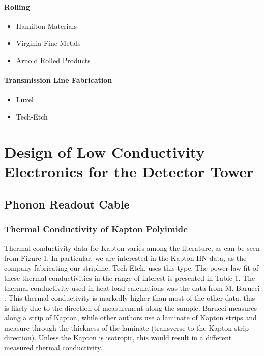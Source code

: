 \documentclass{report}
\begin{document}
\subsubsection{Rolling}
\begin{itemize}
\item Hamilton Materials
\item Virginia Fine Metals
\item Arnold Rolled Products
\end{itemize}

\subsubsection{Transmission Line Fabrication}
\begin{itemize}
\item Luxel
\item Tech-Etch
\end{itemize}

\chapter{Design of Low Conductivity Electronics for the Detector Tower}

\section{Phonon Readout Cable}

\subsection{Thermal Conductivity of Kapton Polyimide}

Thermal conductivity data for Kapton varies among the literature, as can be seen from Figure 1. In particular, we are interested in the Kapton HN data, as the company fabricating our stripline, Tech-Etch, uses this type. The power law fit of these thermal conductivities in the range of interest is presented in Table 1. The thermal conductivity used in heat load calculations was the data from M. Barucci \cite{bar}. This thermal conductivity is markedly higher than most of the other data. this is likely due to the direction of measurement along the sample. Barucci measures along a strip of Kapton, while other authors use a laminate of Kapton strips and measure through the thickness of the laminate (transverse to the Kapton strip direction). Unless the Kapton is isotropic, this would result in a different measured thermal conductivity.
\end{document}
